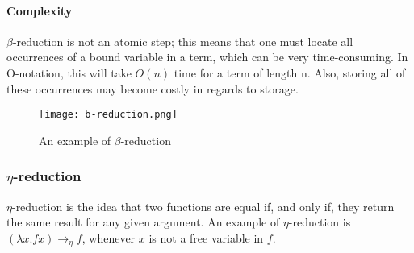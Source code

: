 \paragraph{Complexity}
$\beta$-reduction is not an atomic step; this means that one must locate all occurrences of a bound variable in a term, which can be very time-consuming. In O-notation, this will take $O(n)$ time for a term of length n. Also, storing all of these occurrences may become costly in regards to storage. 

\begin{figure}
    \centering
    \texttt{[image: b-reduction.png]}
    \caption{An example of $\beta$-reduction}
    \label{fig:beta-reduction}
\end{figure}

\subsubsection{$\eta$-reduction}
$\eta$-reduction is the idea that two functions are equal if, and only if, they return the same result for any given argument. An example of $\eta$-reduction is $(\lambda x.f x)  \rightarrow_\eta f$, whenever $x$ is not a free variable in $f$.

